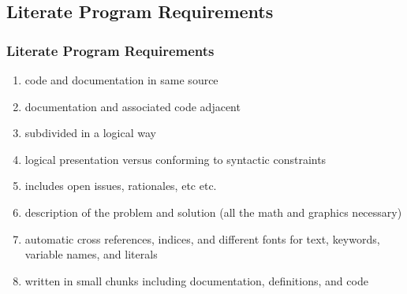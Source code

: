 \documentclass{beamer}
\makeatletter
\newcommand*{\etc}{%
  \@ifnextchar{.}%
  {etc}%
  {etc.\@\xspace}%
}
\makeatother
\begin{document}
\subsection{Literate Program Requirements}
\begin{frame}
  \frametitle{Literate Program Requirements\cite{childs}}
  \begin{enumerate}
    \item code and documentation in same source
    \item documentation and associated code adjacent 
    \item subdivided in a logical way
    \item logical presentation versus conforming to syntactic constraints
    \item includes open issues, rationales, \etc 
    \item description of the problem and solution
      (all the math and graphics necessary)
    \item automatic cross references, indices, and different fonts for text, keywords, 
      variable names, and literals 
    \item written in small chunks including documentation, definitions, and code
  \end{enumerate}
\end{frame}
\end{document}
